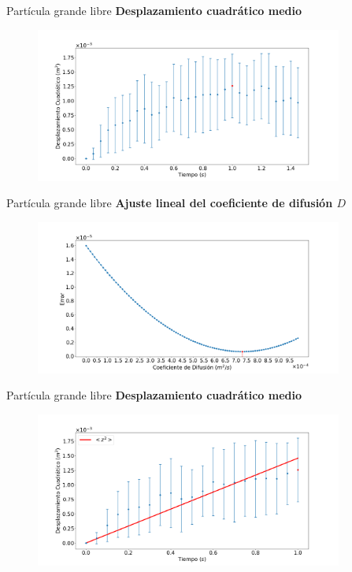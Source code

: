 \begin{frame}{Partícula grande libre}
    \textbf{Desplazamiento cuadrático medio}
    \begin{figure}[H]
        \centering
        \includegraphics[width=0.9\textwidth]{pic/05-results/dcm_graph}
        \label{fig:dcm-graph}
    \end{figure}
\end{frame}

\begin{frame}{Partícula grande libre}
    \textbf{Ajuste lineal del coeficiente de difusión $D$}
    \begin{minipage}[c]{0.8\linewidth}
        \begin{figure}[H]
            \centering
            \includegraphics[width=0.9\textwidth]{pic/05-results/dcm_slope}
            \label{fig:dcm-slope}
        \end{figure}
    \end{minipage}
    \begin{minipage}[c]{0.15\linewidth}
    \end{minipage}
\end{frame}

\begin{frame}{Partícula grande libre}
    \textbf{Desplazamiento cuadrático medio}
    \begin{figure}[H]
        \centering
        \includegraphics[width=0.9\textwidth]{pic/05-results/dcm_graph_and_slope}
        \label{fig:dcm-graph-and-slope}
    \end{figure}
\end{frame}


